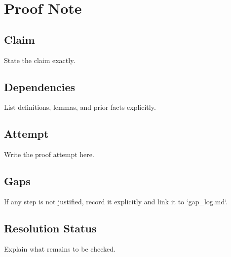 

\section*{Proof Note}

\subsection*{Claim}

State the claim exactly.

\subsection*{Dependencies}

List definitions, lemmas, and prior facts explicitly.

\subsection*{Attempt}

Write the proof attempt here.

\subsection*{Gaps}

If any step is not justified, record it explicitly and link it to `gap_log.md`.

\subsection*{Resolution Status}

Explain what remains to be checked.